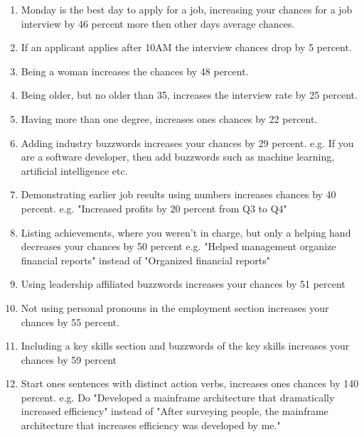 \begin{enumerate}
   \item Monday is the best day to apply for a job, increasing your chances for a job interview by 46 percent more then other days average chances.
   \item If an applicant applies after 10AM the interview chances drop by 5 percent.
   \item Being a woman increases the chances by 48 percent.
   \item Being older, but no older than 35, increases the interview rate by 25 percent.
   \item Having more than one degree, increases ones chances by 22 percent.
   \item Adding industry buzzwords increases your chances by 29 percent.
      e.g. If you are a software developer, then add buzzwords such as machine learning,
      artificial intelligence etc.
   \item Demonstrating earlier job results using numbers increases chances by 40 percent.
      e.g. "Increased profits by 20 percent from Q3 to Q4"
   \item Listing achievements, where you weren't in charge, but only a helping hand
    decreases your chances by 50 percent
      e.g. "Helped management organize financial reports" instead of "Organized financial reports"
   \item Using leadership affiliated buzzwords increases your chances by 51 percent
   \item Not using personal pronouns in the employment section increases your
   chances by 55 percent.
   \item Including a key skills section and buzzwords of the key skills increases your
    chances by 59 percent
   \item Start ones sentences with distinct action verbs, increases ones chances by 140 percent.
      e.g. Do "Developed a mainframe architecture that dramatically increased efficiency"
      instead of "After surveying people, the mainframe architecture that increases efficiency was
      developed by me."\cite{Science_job}
   \end{enumerate}

